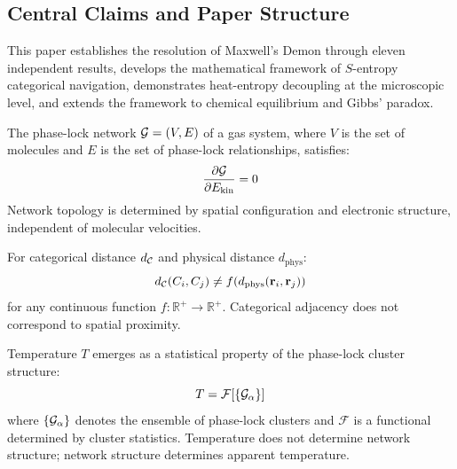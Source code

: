 \subsection{Central Claims and Paper Structure}

This paper establishes the resolution of Maxwell's Demon through eleven independent results, develops the mathematical framework of $S$-entropy categorical navigation, demonstrates heat-entropy decoupling at the microscopic level, and extends the framework to chemical equilibrium and Gibbs' paradox.

\begin{theorem}
\label{thm:kinetic_independence}
The phase-lock network $\mathcal{G} = (V, E)$ of a gas system, where $V$ is the set of molecules and $E$ is the set of phase-lock relationships, satisfies:
\begin{equation}
\frac{\partial \mathcal{G}}{\partial E_{\text{kin}}} = 0
\label{eq:kinetic_independence}
\end{equation}
Network topology is determined by spatial configuration and electronic structure, independent of molecular velocities.
\end{theorem}

\begin{theorem}
\label{thm:distance_inequivalence}
For categorical distance $d_{\mathcal{C}}$ and physical distance $d_{\text{phys}}$:
\begin{equation}
d_{\mathcal{C}}(C_i, C_j) \neq f(d_{\text{phys}}(\mathbf{r}_i, \mathbf{r}_j))
\label{eq:distance_inequivalence}
\end{equation}
for any continuous function $f: \mathbb{R}^+ \to \mathbb{R}^+$. Categorical adjacency does not correspond to spatial proximity.
\end{theorem}

\begin{theorem}
\label{thm:temperature_emergence}
Temperature $T$ emerges as a statistical property of the phase-lock cluster structure:
\begin{equation}
T = \mathcal{F}[\{\mathcal{G}_\alpha\}]
\label{eq:temperature_emergence}
\end{equation}
where $\{\mathcal{G}_\alpha\}$ denotes the ensemble of phase-lock clusters and $\mathcal{F}$ is a functional determined by cluster statistics. Temperature does not determine network structure; network structure determines apparent temperature.
\end{theorem}

